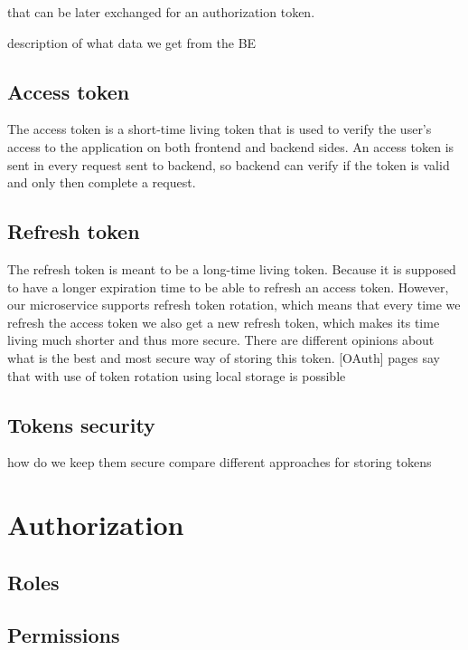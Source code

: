 that can be later exchanged for an authorization token. 





description of what data we get from the BE

\subsection{Access token}
The access token is a short-time living token that is used to verify the user's access to the application on both frontend and backend sides. An access token is sent in every request sent to backend, so backend can verify if the token is valid and only then complete a request.

\subsection{Refresh token}
The refresh token is meant to be a long-time living token. Because it is supposed to have a longer expiration time to be able to refresh an access token.
However, our microservice supports refresh token rotation, which means that every time we refresh the access token we also get a new refresh token, which makes its time living much shorter and thus more secure. There are different opinions about what is the best and most secure way of storing this token. [OAuth] pages say that with use of token rotation using local storage is possible

\subsection{Tokens security}
how do we keep them secure
compare different approaches for storing tokens


\section{Authorization}\label{sec:authorization}

\subsection{Roles}

\subsection{Permissions}





